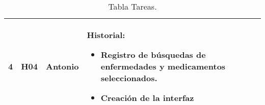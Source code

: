 \begin{table}[htb]
\begin{tabular}{|l|p{1.5cm}|p{2.5cm}|p{10cm}|}
	
	4 & H04 & Antonio & Historial:
	\begin{itemize}
		\item Registro de búsquedas de enfermedades y medicamentos seleccionados.
		\item Creación de la interfaz
	\end{itemize}\\ \hline
	
	
\end{tabular}
\caption{Tabla Tareas.}
\label{tabla:Tareas}
\end{table}
